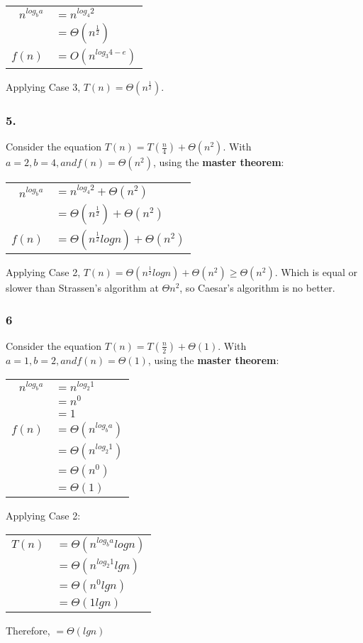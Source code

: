 \documentclass[11pt,letterpaper]{article}
\begin{document}
\begin{tabular}{r l}
	$n^{ log_b a }$		&	$ = n^{log_4 2} $\\
					&	$ = \Theta(n^{\frac{1}{2}} ) $ \\
	$f(n)$			&	$ = O(n^{log_3 4 - e}) $ \\
\end{tabular}

Applying Case 3, $T(n) = \Theta(n^{\frac{1}{2}}) $.


\subsubsection*{5.}
Consider the equation $T(n) = T(\frac{n}{4}) + \Theta(n^2)$. With $a = 2, b = 4, and f(n) = \Theta(n^2) $, using the \textbf{master theorem}:

\begin{tabular}{r l}
	$n^{ log_b a }$		&	$ = n^{log_4 2} + \Theta(n^2) $\\
					&	$ = \Theta(n^{\frac{1}{2}} ) + \Theta(n^2) $ \\
	$f(n)$			&	$ = \Theta(n^{\frac{1}{2}} log n) + \Theta(n^2)$ \\
\end{tabular}

Applying Case 2, $T(n) = \Theta(n^{\frac{1}{2}} log n) + \Theta(n^2) \geq \Theta(n^2)$. Which is equal or
slower than Strassen's algorithm at $\Theta{n^2}$, so Caesar's algorithm is no better.


\subsubsection*{6}
Consider the equation $T(n) = T(\frac{n}{2}) + \Theta(1)$. With $a = 1, b = 2, and f(n) = \Theta(1) $, using the \textbf{master theorem}:

\begin{tabular}{r l}
	$n^{ log_b a }$		&	$ = n^{log_2 1} $\\
					&	$ = n^0 $ \\
					&	$ = 1$ \\
	$f(n)$			&	$ = \Theta(n^{log_b a}) $ \\
					&	$ = \Theta(n^{log_2 1}) $ \\
					&	$ = \Theta(n^0) $ \\
					&	$ = \Theta(1) $ \\ 
\end{tabular}

Applying Case 2:

\begin{tabular}{r l}
	$T(n)$			&	$ = \Theta(n^{log_b a} log n)$ \\
					&	$ = \Theta(n^{log_2 1} lg n) $ \\
					&	$ = \Theta(n^0 lg n) $ \\
					&	$ = \Theta(1 lg n) $ \\
\end{tabular}

Therefore, $ = \Theta(lg n) $
\end{document}
